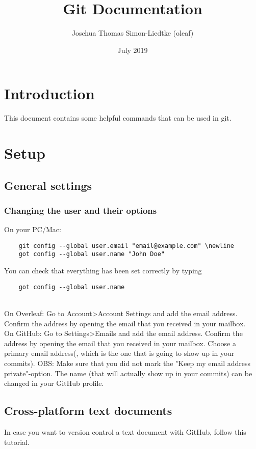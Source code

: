 \documentclass{article}
\title{Git Documentation}
\author{Joschua Thomas Simon-Liedtke (oleaf)}
\date{July 2019}
\begin{document}
\maketitle

\section{Introduction}
This document contains some helpful commands that can be used in git.

\section{Setup}

\subsection{General settings}

\subsubsection{Changing the user and their options}

On your PC/Mac:
\begin{verbatim}
	git config --global user.email "email@example.com" \newline
	got config --global user.name "John Doe"
\end{verbatim}
You can check that everything has been set correctly by typing
\begin{verbatim}
	got config --global user.name
\end{verbatim}
\\

On Overleaf:
Go to Account\textgreater  Account Settings and add the email address. Confirm the address by opening the email that you received in your mailbox.
\\

On GitHub:
Go to Settings\textgreater  Emails and add the email address. Confirm the address by opening the email that you received in your mailbox. Choose a primary email address(, which is the one that is going to show up in your commits). OBS: Make sure that you did not mark the "Keep my email address private"-option. The name (that will actually show up in your commits) can be changed in your GitHub profile.


\subsection{Cross-platform text documents}
In case you want to version control a text document with GitHub, follow this tutorial.
\end{document}
